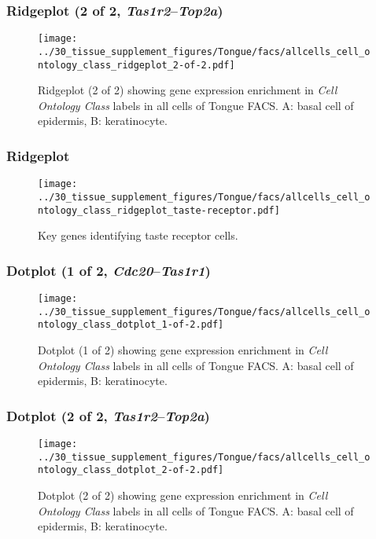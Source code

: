 \clearpage

\subsubsection{Ridgeplot (2 of 2, \emph{Tas1r2}--\emph{Top2a})}
\begin{figure}[h]
\centering
\texttt{[image: ../30\_tissue\_supplement\_figures/Tongue/facs/allcells\_cell\_ontology\_class\_ridgeplot\_2-of-2.pdf]}

\caption{ Ridgeplot (2 of 2)  showing gene expression enrichment in \emph{Cell Ontology Class} labels in all cells of Tongue FACS. A: basal cell of epidermis, B: keratinocyte.}
\end{figure}


\clearpage

\subsubsection{Ridgeplot}
\begin{figure}[h]
\centering
\texttt{[image: ../30\_tissue\_supplement\_figures/Tongue/facs/allcells\_cell\_ontology\_class\_ridgeplot\_taste-receptor.pdf]}

\caption{Key genes identifying taste receptor cells.
}
\end{figure}


\clearpage

\subsubsection{Dotplot (1 of 2, \emph{Cdc20}--\emph{Tas1r1})}
\begin{figure}[h]
\centering
\texttt{[image: ../30\_tissue\_supplement\_figures/Tongue/facs/allcells\_cell\_ontology\_class\_dotplot\_1-of-2.pdf]}

\caption{ Dotplot (1 of 2)  showing gene expression enrichment in \emph{Cell Ontology Class} labels in all cells of Tongue FACS. A: basal cell of epidermis, B: keratinocyte.}
\end{figure}


\clearpage

\subsubsection{Dotplot (2 of 2, \emph{Tas1r2}--\emph{Top2a})}
\begin{figure}[h]
\centering
\texttt{[image: ../30\_tissue\_supplement\_figures/Tongue/facs/allcells\_cell\_ontology\_class\_dotplot\_2-of-2.pdf]}

\caption{ Dotplot (2 of 2)  showing gene expression enrichment in \emph{Cell Ontology Class} labels in all cells of Tongue FACS. A: basal cell of epidermis, B: keratinocyte.}
\end{figure}


